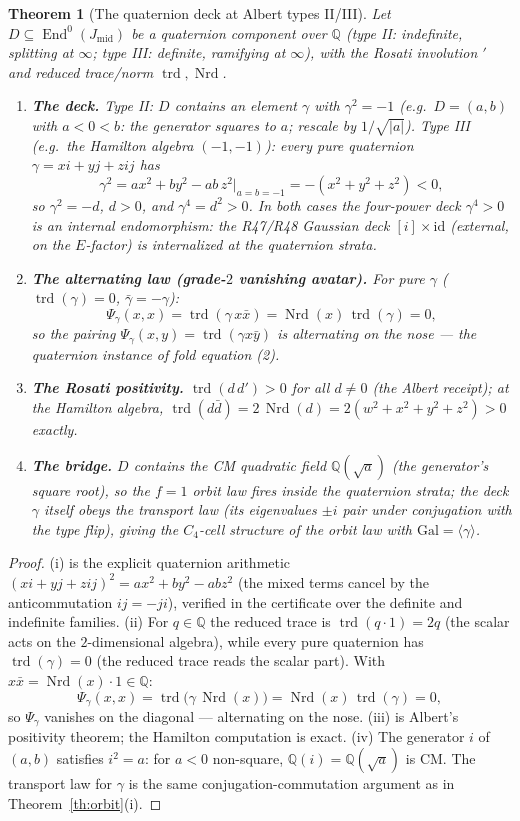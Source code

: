 \documentclass[11pt]{article}
\newcommand{\Q}{\mathbb Q}
\newcommand{\End}{\operatorname{End}}
\newcommand{\trd}{\operatorname{trd}}
\newcommand{\Nrd}{\operatorname{Nrd}}
\newtheorem{theorem}{Theorem}[section]
\begin{document}
\begin{theorem}[The quaternion deck at Albert types II/III]
\label{th:quaternion}
Let $D\subseteq\End^0(J_{\mathrm{mid}})$ be a quaternion component
over $\Q$ (type II: indefinite, splitting at $\infty$; type III:
definite, ramifying at $\infty$), with the Rosati involution
$'$ and reduced trace/norm $\trd,\Nrd$.
\begin{enumerate}[label=(\roman*)]
\item \textbf{The deck.} Type II: $D$ contains an element $\gamma$
with $\gamma^2=-1$ (e.g.\ $D=(a,b)$ with $a<0<b$: the generator
squares to $a$; rescale by $1/\sqrt{|a|}$). Type III (e.g.\ the
Hamilton algebra $(-1,-1)$): every pure quaternion
$\gamma=xi+yj+zij$ has
\[
\gamma^2=ax^2+by^2-ab\,z^2\big|_{a=b=-1}=-(x^2+y^2+z^2)<0,
\]
so $\gamma^2=-d$, $d>0$, and $\gamma^4=d^2>0$. In both cases the
four-power deck $\gamma^4>0$ is an \emph{internal} endomorphism: the
R47/R48 Gaussian deck $[i]\times\mathrm{id}$ (external, on the
$E$-factor) is internalized at the quaternion strata.
\item \textbf{The alternating law (grade-$2$ vanishing avatar).} For
pure $\gamma$ ($\trd(\gamma)=0$, $\bar\gamma=-\gamma$):
\[
\Psi_\gamma(x,x)=\trd(\gamma\,x\bar x)=\Nrd(x)\,\trd(\gamma)=0,
\]
so the pairing $\Psi_\gamma(x,y)=\trd(\gamma x\bar y)$ is alternating
on the nose --- the quaternion instance of fold equation (2).
\item \textbf{The Rosati positivity.} $\trd(d\,d')>0$ for all $d\neq0$
(the Albert receipt); at the Hamilton algebra,
$\trd(d\bar d)=2\,\Nrd(d)=2(w^2+x^2+y^2+z^2)>0$ exactly.
\item \textbf{The bridge.} $D$ contains the CM quadratic field
$\Q(\sqrt a)$ (the generator's square root), so the $f=1$ orbit law
fires inside the quaternion strata; the deck $\gamma$ itself obeys the
transport law (its eigenvalues $\pm i$ pair under conjugation with the
type flip), giving the $C_4$-cell structure of the orbit law with
$\mathrm{Gal}=\langle\gamma\rangle$.
\end{enumerate}
\end{theorem}

\begin{proof}
(i) is the explicit quaternion arithmetic
$(xi+yj+zij)^2=ax^2+by^2-abz^2$ (the mixed terms cancel by the
anticommutation $ij=-ji$), verified in the certificate over the
definite and indefinite families. (ii) For $q\in\Q$ the reduced trace is $\trd(q\cdot1)=2q$
(the scalar acts on the $2$-dimensional algebra), while every pure
quaternion has $\trd(\gamma)=0$ (the reduced trace reads the scalar
part). With $x\bar x=\Nrd(x)\cdot1\in\Q$:
\[
\Psi_\gamma(x,x)=\trd\bigl(\gamma\,\Nrd(x)\bigr)
=\Nrd(x)\,\trd(\gamma)=0,
\]
so $\Psi_\gamma$ vanishes on the diagonal --- alternating on the nose. (iii) is Albert's
positivity theorem; the Hamilton computation is exact. (iv) The
generator $i$ of $(a,b)$ satisfies $i^2=a$: for $a<0$ non-square,
$\Q(i)=\Q(\sqrt a)$ is CM. The transport law for $\gamma$ is the same
conjugation-commutation argument as in Theorem~\ref{th:orbit}(i).
\end{proof}
\end{document}
